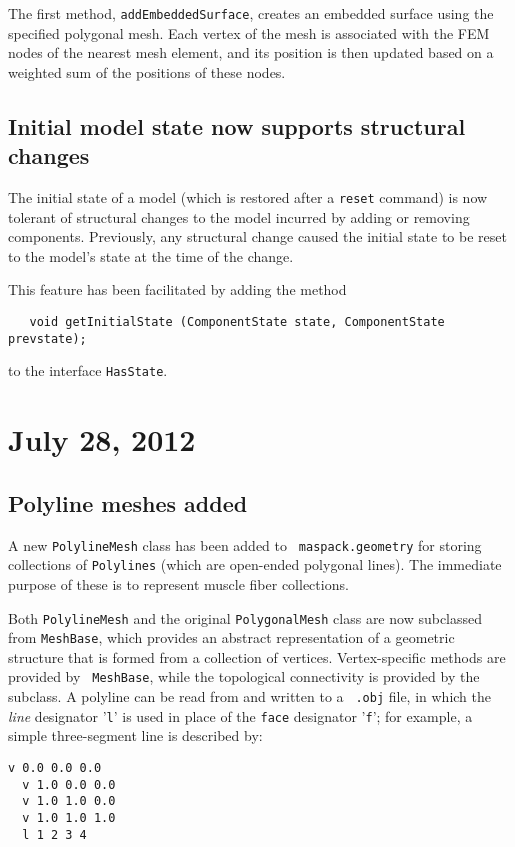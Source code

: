\documentclass{article}
\begin{document}
The first method, {\tt addEmbeddedSurface}, creates an embedded surface
using the specified polygonal mesh. Each vertex of the mesh is
associated with the FEM nodes of the nearest mesh element, and its
position is then updated based on a weighted sum of the positions of
these nodes.

\subsection*{Initial model state now supports structural changes}

The initial state of a model (which is restored after a {\tt reset}
command) is now tolerant of structural changes to the model incurred
by adding or removing components. Previously, any structural change
caused the initial state to be reset to the model's state at the time
of the change.

This feature has been facilitated by adding the method
\begin{verbatim}
   void getInitialState (ComponentState state, ComponentState prevstate);
\end{verbatim}
to the interface {\tt HasState}.

\section*{July 28, 2012}

\subsection*{Polyline meshes added}

A new {\tt PolylineMesh} class has been added to {\tt
maspack.geometry} for storing collections of {\tt Polylines} (which
are open-ended polygonal lines). The immediate purpose of these is to
represent muscle fiber collections.

Both {\tt PolylineMesh} and the original {\tt PolygonalMesh} class are
now subclassed from {\tt MeshBase}, which provides an abstract
representation of a geometric structure that is formed from a
collection of vertices. Vertex-specific methods are provided by {\tt
MeshBase}, while the topological connectivity is provided by the
subclass.  A polyline can be read from and written to a {\tt
.obj} file, in which the {\it line} designator '{\tt l}' is used in
place of the {\tt face} designator '{\tt f}'; for example, a simple
three-segment line is described by:
\begin{lstlisting}[]
  v 0.0 0.0 0.0
  v 1.0 0.0 0.0
  v 1.0 1.0 0.0
  v 1.0 1.0 1.0
  l 1 2 3 4
\end{lstlisting}
\end{document}
